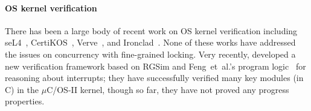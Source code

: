 \paragraph{OS kernel verification} There has been a large body
of recent work on OS kernel verification including
seL4~\cite{klein2009sel4,klein14},
CertiKOS~\cite{dscal15,chen16,costanzo16}, Verve~\cite{hawblitzel10},
and Ironclad~\cite{ironclad14}. None of these works have addressed the
issues on concurrency with fine-grained locking. Very recently,
\citet{xu16} developed a new verification framework based on RGSim
and Feng~{et~al.}'s program logic~\cite{feng08:aim} for reasoning
about interrupts; they have successfully verified many key modules
(in C) in the $\mu$C/OS-II kernel, though so far, they have not proved
any progress properties.